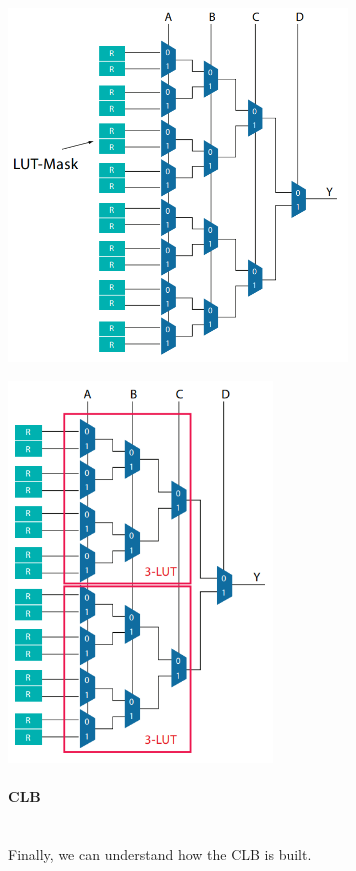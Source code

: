 \documentclass{article}
\begin{document}
\begin{minipage}[t]{0.5\textwidth}
    \centering
    \includegraphics[width=9cm, scale=1]{S2/4LUT.PNG}
\end{minipage}%
\begin{minipage}[t]{0.5\textwidth}
    \centering
    \includegraphics[width=7cm, scale=1]{S2/4LUT_3LUT.PNG}
\end{minipage}%

\paragraph{CLB}\mbox{}\\
Finally, we can understand how the CLB is built.
\end{document}
